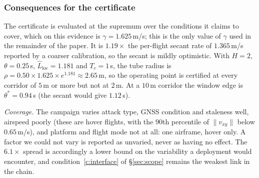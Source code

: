 \subsubsection{Consequences for the certificate}
The certificate is evaluated at the supremum over the conditions it claims to
cover, which on this evidence is $\gamma=1.625$\,m/s; this is the only value of
$\gamma$ used in the remainder of the paper. It is $1.19\times$ the per-flight
secant rate of $1.365$\,m/s reported by a coarser calibration, so the secant is
mildly optimistic. With $H=2$, $\theta=0.25$\,s, $\hat L_{\mathrm{loc}}=1.181$
and $T_c=1$\,s, the tube radius is
$\rho=0.50\times1.625\times e^{1.181}\approx2.65$\,m, so the operating point is
certified at every corridor of $5$\,m or more but not at $2$\,m. At a
$10$\,m corridor the window edge is $\theta^{*}=0.94$\,s (the secant would give
$1.12$\,s).

\emph{Coverage.} The campaign varies attack type, GNSS condition and staleness
well, airspeed poorly (these are hover flights, with the $90$th percentile of
$\lVert v_{xy}\rVert$ below $0.65$\,m/s), and platform and flight mode not at
all: one airframe, hover only. A factor we could not vary is
reported as unvaried, never as having no effect. The $6.1\times$ spread is
accordingly a lower bound on the variability a deployment would encounter, and
condition~\ref{c:interface} of \S\ref{sec:scope} remains the weakest link in the
chain.

